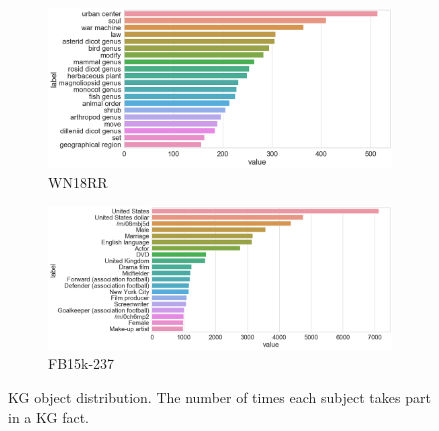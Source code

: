 \begin{figure}[H]
	\begin{subfigure}[b]{.5\linewidth}
   		\centering
    		\includegraphics[width=1.0\linewidth, height=0.7\linewidth]{WN18RR_Object_Counts}
		\captionsetup{justification=centering}
		\caption{WN18RR}
	\end{subfigure}
	\begin{subfigure}[b]{.5\linewidth}
   		\centering
		\includegraphics[width=1.0\linewidth, height=0.7\linewidth]{FB15k-237_Object_Counts}
		\captionsetup{justification=centering}
		\caption{FB15k-237}
	\end{subfigure}
	\captionsetup{justification=centering}
	\caption{KG object distribution. The number of times each subject takes part in a KG fact.}
\end{figure}

